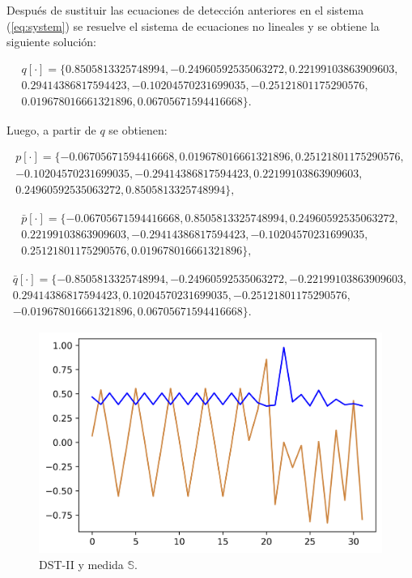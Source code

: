Después de sustituir las ecuaciones de detección anteriores en el sistema (\ref{eq:system}) se resuelve el sistema
de ecuaciones no lineales y se obtiene la siguiente solución:

$$
	\begin{array}{lcl}
		q[\cdot] = \{ 0.8505813325748994, -0.24960592535063272, 0.22199103863909603,\\ 
			0.29414386817594423, -0.10204570231699035, -0.25121801175290576, \\ 
		0.019678016661321896, 0.06705671594416668 \}.
	\end{array}
$$

Luego, a partir de $q$ se obtienen:

$$
	\begin{array}{lcl}
		p[\cdot] = \{ -0.06705671594416668, 0.019678016661321896, 0.25121801175290576,\\ 
			-0.10204570231699035, -0.29414386817594423, 0.22199103863909603, \\ 
			0.24960592535063272, 0.8505813325748994\},
	\end{array}
$$

$$
	\begin{array}{lcl}
		\bar p[\cdot] = \{ -0.06705671594416668, 0.8505813325748994, 0.24960592535063272,\\ 
			0.22199103863909603, -0.29414386817594423, -0.10204570231699035,\\ 
		0.25121801175290576, 0.019678016661321896 \},
	\end{array}
$$

$$
	\begin{array}{lcl}
		\bar q[\cdot] = \{ -0.8505813325748994, -0.24960592535063272, -0.22199103863909603,\\
			0.29414386817594423, 0.10204570231699035, -0.25121801175290576, \\ 
		-0.019678016661321896, 0.06705671594416668 \}.
	\end{array}
$$

\begin{figure} 
	\centering
	\includegraphics[scale=0.8]{Graphics/example-guido-signal-dst-s.png}
	\caption{DST-II y medida $\mathbb{S}$.} \label{fig:example-guido-signal-dst-s}
\end{figure}

